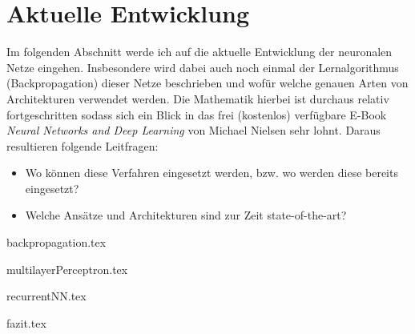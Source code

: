 \part{Aktuelle Entwicklung}

Im folgenden Abschnitt werde ich auf die aktuelle Entwicklung der neuronalen Netze eingehen. Insbesondere wird dabei auch noch einmal der Lernalgorithmus (Backpropagation) dieser Netze beschrieben und wofür welche genauen Arten von Architekturen verwendet werden. Die Mathematik hierbei ist durchaus relativ fortgeschritten sodass sich ein Blick in das frei (kostenlos) verfügbare E-Book \emph{Neural Networks and Deep Learning} von Michael Nielsen \cite{dlnielsen} sehr lohnt. Daraus resultieren folgende Leitfragen: 

\begin{itemize}
\item Wo können diese Verfahren eingesetzt werden, bzw. wo werden diese bereits eingesetzt?
\item Welche Ansätze und Architekturen sind zur Zeit state-of-the-art?
\end{itemize}

{backpropagation.tex}
\clearpage

{multilayerPerceptron.tex}
\clearpage

{recurrentNN.tex}
\clearpage

{fazit.tex}
\clearpage

